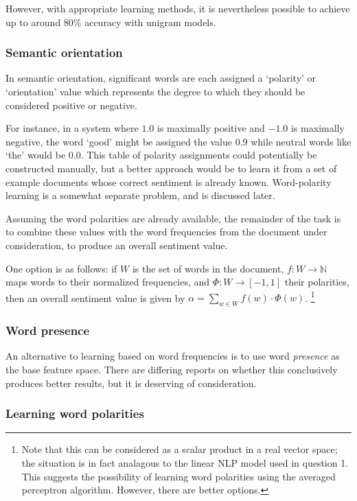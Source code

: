 \documentclass[11pt]{article}
\begin{document}
However, with appropriate learning methods, it is nevertheless possible to
achieve up to around 80\% accuracy with unigram models\cite{Pang2002}.
\subsubsection*{Semantic orientation}

In semantic orientation, significant words are each assigned a `polarity' or
`orientation' value which represents the degree to which they should be
considered positive or negative.

For instance, in a system where $1.0$ is maximally positive and $-1.0$ is
maximally negative, the word `good' might be assigned the value $0.9$ while
neutral words like `the' would be $0.0$. This table of polarity assignments
could potentially be constructed manually, but a better approach would be to
learn it from a set of example documents whose correct sentiment is already
known. Word-polarity learning is a somewhat separate problem, and is discussed
later.

Assuming the word polarities are already available, the remainder of the task
is to combine these values with the word frequencies from the document under
consideration, to produce an overall sentiment value.

One option is as follows: if $W$ is the set of words in the document, $f:W \to
\mathbb{N}$ maps words to their normalized frequencies, and $\Phi:W \to [-1,
1]$ their polarities, then an overall sentiment value is given by $\alpha =
\sum_{w \in W} f(w)\cdot\Phi(w)$.  \footnote{Note that this can be considered
as a scalar product in a real vector space; the situation is in fact analagous
to the linear NLP model used in question 1. This suggests the possibility of
learning word polarities using the averaged perceptron algorithm. However, there are
better options.}


\subsubsection*{Word presence}

An alternative to learning based on word frequencies is to use word
\emph{presence} as the base feature space. There are differing reports on
whether this conclusively produces better results\cite{Pang2002}, but it is
deserving of consideration.

\subsubsection*{Learning word polarities}
\end{document}
